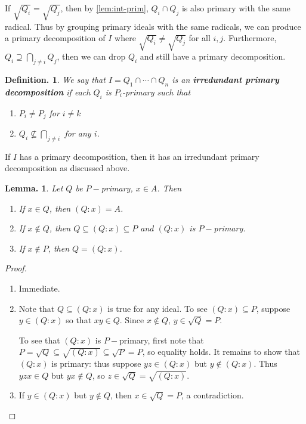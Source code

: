 \documentclass[11pt, a4paper]{memoir}
\theoremstyle{change}
\newtheorem{lemma}[theorem]{Lemma.}
\theoremstyle{plain}
\theoremstyle{nonumberplain}
\newtheorem{definition}{Definition.}
\newtheorem{proof}{Proof}
\numberwithin{equation}{section}
\begin{document}
If $\sqrt{Q_i}=\sqrt{Q_j}$, then by \cref{lem:int-prim}, $Q_i\cap Q_j$ is also primary with the same radical.
Thus by grouping primary ideals with the same radicals, we can produce a primary decomposition of $I$ where $\sqrt{Q_i}\neq\sqrt{Q_j}$ for all $i,j$.
Furthermore, $Q_i\supseteq\bigcap_{j\neq i}Q_j$, then we can drop $Q_i$ and still have a primary decomposition.
\begin{definition}
    We say that $I=Q_1\cap\cdots\cap Q_n$ is an \textbf{irredundant primary decomposition} if each $Q_i$ is $P_i$-primary such that
    \begin{enumerate}[nolistsep]
        \item $P_i\neq P_j$ for $i\neq k$
        \item $Q_i\nsubseteq\bigcap_{j\neq i}$ for any $i$.
    \end{enumerate}
\end{definition}
If $I$ has a primary decomposition, then it has an irredundant primary decomposition as discussed above.
\begin{lemma}\label{lem:col-pri}
    Let $Q$ be $P-$primary, $x\in A$.
    Then
    \begin{enumerate}[nl,r]
        \item If $x\in Q$, then $(Q:x)=A$.
        \item If $x\notin Q$, then $Q\subseteq(Q:x)\subseteq P$ and $(Q:x)$ is $P-$primary.
        \item If $x\notin P$, then $Q=(Q:x)$.
    \end{enumerate}
\end{lemma}
\begin{proof}
    \begin{enumerate}[r]
        \item Immediate.
        \item Note that $Q\subseteq(Q:x)$ is true for any ideal.
            To see $(Q:x)\subseteq P$, suppose $y\in (Q:x)$ so that $xy\in Q$.
            Since $x\notin Q$, $y\in\sqrt{Q}=P$.

            To see that $(Q:x)$ is $P-$primary, first note that $P=\sqrt{Q}\subseteq\sqrt{(Q:x)}\subseteq\sqrt{P}=P$, so equality holds.
            It remains to show that $(Q:x)$ is primary: thus suppose $yz\in(Q:x)$ but $y\notin(Q:x)$.
            Thus $yzx\in Q$ but $yx\notin Q$, so $z\in\sqrt{Q}=\sqrt{(Q:x)}$.

        \item If $y\in(Q:x)$ but $y\notin Q$, then $x\in\sqrt{Q}=P$, a contradiction.
    \end{enumerate}
\end{proof}
\end{document}
